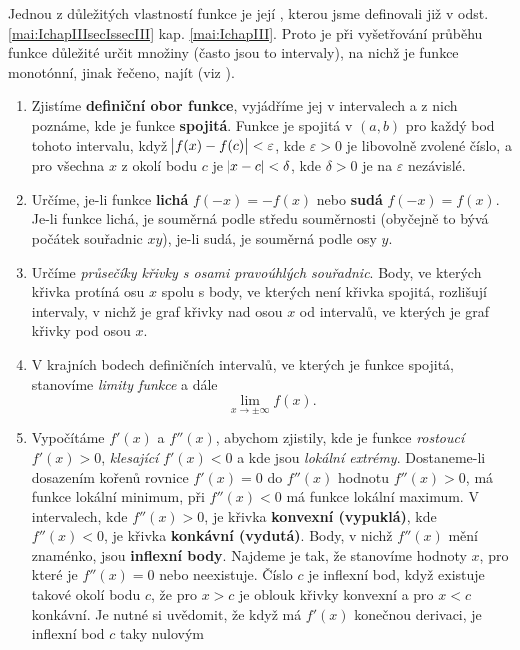   Jednou z důležitých vlastností funkce je její , kterou jsme definovali již v odst.
  \ref{mai:IchapIIIsecIssecIII} kap. \ref{mai:IchapIII}. Proto je při vyšetřování průběhu
  funkce důležité určit množiny (často jsou to intervaly), na nichž je funkce monotónní, jinak
  řečeno, najít  (viz
  \cite[s.~208]{Brabec1989}). 
    \begin{enumerate}[noitemsep]
      \item Zjistíme \textbf{definiční obor funkce}, vyjádříme jej v intervalech a z nich poznáme,
        kde je funkce \textbf{spojitá}. Funkce je spojitá v $(a,b)$ pro každý bod tohoto intervalu,
        když $\abs{f(x)-f(c)}<\varepsilon$, kde $\varepsilon>0$ je libovolně zvolené číslo, a pro
        všechna $x$ z okolí bodu $c$ je $\abs{x-c}<\delta$, kde $\delta>0$ je na $\varepsilon$
        nezávislé.
      \item Určíme, je-li funkce \textbf{lichá} $f(-x)=-f(x)$ nebo \textbf{sudá} $f(-x)=f(x)$. Je-li
        funkce lichá, je souměrná podle středu souměrnosti (obyčejně to bývá počátek souřadnic
        $xy$), je-li sudá, je souměrná podle osy $y$.
      \item Určíme \emph{průsečíky křivky s osami pravoúhlých souřadnic}. Body, ve kte\-rých křivka
        protíná osu $x$ spolu s body, ve kte\-rých není křivka spojitá, rozlišují intervaly, v nichž
        je graf křivky nad osou $x$ od intervalů, ve kterých je graf křivky pod osou $x$.
      \item V krajních bodech definičních intervalů, ve kterých je funkce spojitá, stano\-víme
      \emph{limity funkce} a dále $$\lim_{x \to \pm \infty}f(x).$$
      \item Vypočítáme $f'(x)$ a $f''(x)$, abychom zjistily, kde je funkce \emph{rostoucí}     
        $f'(x)>0$, \emph{klesající} $f'(x)<0$ a kde jsou \emph{lokální extrémy}. Dostaneme-li
        dosazením kořenů rovnice $f'(x)=0$ do $f''(x)$ hodnotu $f''(x)>0$, má funkce lokální
        minimum, při $f''(x)<0$ má funkce lokální maximum. V intervalech, kde $f''(x)>0$, je křivka
        \textbf{konvexní (vypuklá)}, kde $f''(x)<0$, je křivka \textbf{konkávní (vydutá)}. Body, v
        nichž $f''(x)$ mění znaménko, jsou \textbf{inflexní body}. Najdeme je tak, že stanovíme
        hodnoty $x$, pro které je $f''(x)=0$ nebo neexistuje. Číslo $c$ je inflexní bod, když
        existuje takové okolí bodu $c$, že pro $x>c$ je oblouk křivky konvexní a pro $x<c$ konkávní.
        Je nutné si uvědomit, že když má $f'(x)$ konečnou derivaci, je inflexní bod $c$ taky nulovým

\end{enumerate}
